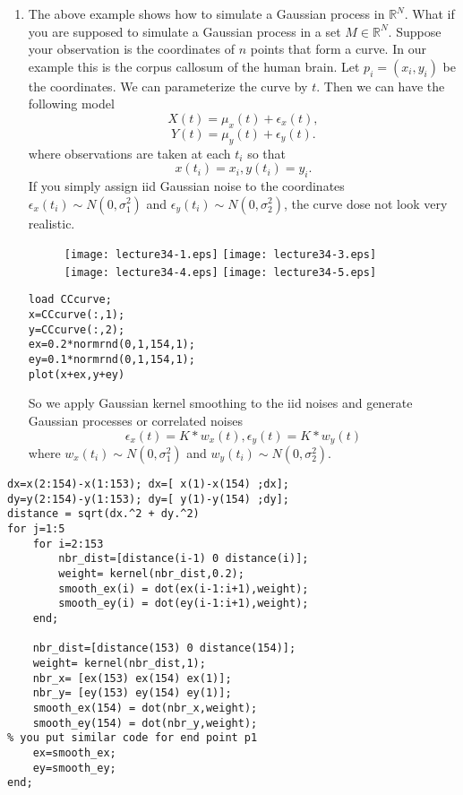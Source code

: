 \documentclass[10pt,twocolumn]{article} %
\begin{document}
\begin{enumerate}
\item The above example shows how to simulate a Gaussian process
in $\mathbb{R}^N$. What if you are supposed to simulate a Gaussian
process in a set $M \in \mathbb{R}^N$. Suppose your observation is
the coordinates of $n$ points that form a curve. In our example
this is the corpus callosum of the human brain. Let
$p_i=(x_i,y_i)$ be the coordinates. We can parameterize the curve
by $t$. Then we can have the following model $$X(t) = \mu_x(t) +
\epsilon_x(t),$$
 $$Y(t) = \mu_y(t) + \epsilon_y(t).$$
where observations are taken at each $t_i$ so that $$x(t_i)=x_i,
y(t_i)=y_i.$$ If you simply assign iid Gaussian noise to the
coordinates $\epsilon_x(t_i) \sim N(0,\sigma_1^2)$ and
$\epsilon_y(t_i) \sim N(0,\sigma_2^2)$, the curve dose not look
very realistic.
\begin{figure}
\centering
\renewcommand{\baselinestretch}{1}
\texttt{[image: lecture34-1.eps]}
\texttt{[image: lecture34-3.eps]}
\texttt{[image: lecture34-4.eps]}
\texttt{[image: lecture34-5.eps]}
\end{figure}
\begin{verbatim}
load CCcurve;
x=CCcurve(:,1);
y=CCcurve(:,2);
ex=0.2*normrnd(0,1,154,1);
ey=0.1*normrnd(0,1,154,1);
plot(x+ex,y+ey)
 \end{verbatim}
So we apply Gaussian kernel smoothing to the iid noises and
generate Gaussian processes or correlated noises
$$\epsilon_x(t) = K*w_x(t), \epsilon_y(t) = K*w_y(t)$$
where $w_x(t_i) \sim N(0,\sigma_1^2)$ and $w_y(t_i) \sim
N(0,\sigma_2^2)$.
\end{enumerate}
\begin{verbatim}
dx=x(2:154)-x(1:153); dx=[ x(1)-x(154) ;dx];
dy=y(2:154)-y(1:153); dy=[ y(1)-y(154) ;dy];
distance = sqrt(dx.^2 + dy.^2)
for j=1:5
    for i=2:153
        nbr_dist=[distance(i-1) 0 distance(i)];
        weight= kernel(nbr_dist,0.2);
        smooth_ex(i) = dot(ex(i-1:i+1),weight);
        smooth_ey(i) = dot(ey(i-1:i+1),weight);
    end;

    nbr_dist=[distance(153) 0 distance(154)];
    weight= kernel(nbr_dist,1);
    nbr_x= [ex(153) ex(154) ex(1)];
    nbr_y= [ey(153) ey(154) ey(1)];
    smooth_ex(154) = dot(nbr_x,weight);
    smooth_ey(154) = dot(nbr_y,weight);
% you put similar code for end point p1
    ex=smooth_ex;
    ey=smooth_ey;
end;
\end{verbatim}
\end{document}

